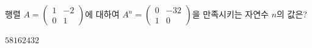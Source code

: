 행렬 $A=\begin{pmatrix} 1 & -2 \\ 0 & 1 \end{pmatrix}$에 대하여 $A^n=\begin{pmatrix} 0 & -32 \\ 1 & 0 \end{pmatrix}$을 만족시키는 자연수 $n$의 값은?
\begin{choices32}{$5$}{$8$}{$16$}{$24$}{$32$}\end{choices32}
